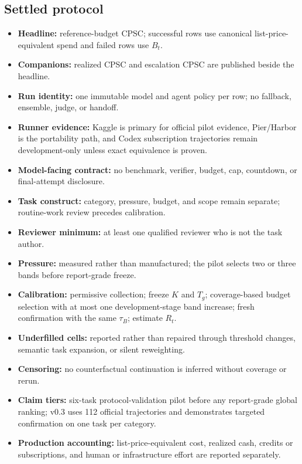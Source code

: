 \documentclass[11pt]{article}
\begin{document}
\subsection{Settled protocol}\hypertarget{a1-settled-protocol}{}\label{a1-settled-protocol}

\begin{itemize}
\item{} \textbf{Headline:} reference-budget CPSC; successful rows use canonical list-price-equivalent spend and failed rows use $B_t$.
\item{} \textbf{Companions:} realized CPSC and escalation CPSC are published beside the headline.
\item{} \textbf{Run identity:} one immutable model and agent policy per row; no fallback, ensemble, judge, or handoff.
\item{} \textbf{Runner evidence:} Kaggle is primary for official pilot evidence, Pier/Harbor is the portability path, and Codex subscription trajectories remain development-only unless exact equivalence is proven.
\item{} \textbf{Model-facing contract:} no benchmark, verifier, budget, cap, countdown, or final-attempt disclosure.
\item{} \textbf{Task construct:} category, pressure, budget, and scope remain separate; routine-work review precedes calibration.
\item{} \textbf{Reviewer minimum:} at least one qualified reviewer who is not the task author.
\item{} \textbf{Pressure:} measured rather than manufactured; the pilot selects two or three bands before report-grade freeze.
\item{} \textbf{Calibration:} permissive collection; freeze $K$ and $T_g$; coverage-based budget selection with at most one development-stage band increase; fresh confirmation with the same $\tau_B$; estimate $R_t$.
\item{} \textbf{Underfilled cells:} reported rather than repaired through threshold changes, semantic task expansion, or silent reweighting.
\item{} \textbf{Censoring:} no counterfactual continuation is inferred without coverage or rerun.
\item{} \textbf{Claim tiers:} six-task protocol-validation pilot before any report-grade global ranking; v0.3 uses 112 official trajectories and demonstrates targeted confirmation on one task per category.
\item{} \textbf{Production accounting:} list-price-equivalent cost, realized cash, credits or subscriptions, and human or infrastructure effort are reported separately.
\end{itemize}
\end{document}
